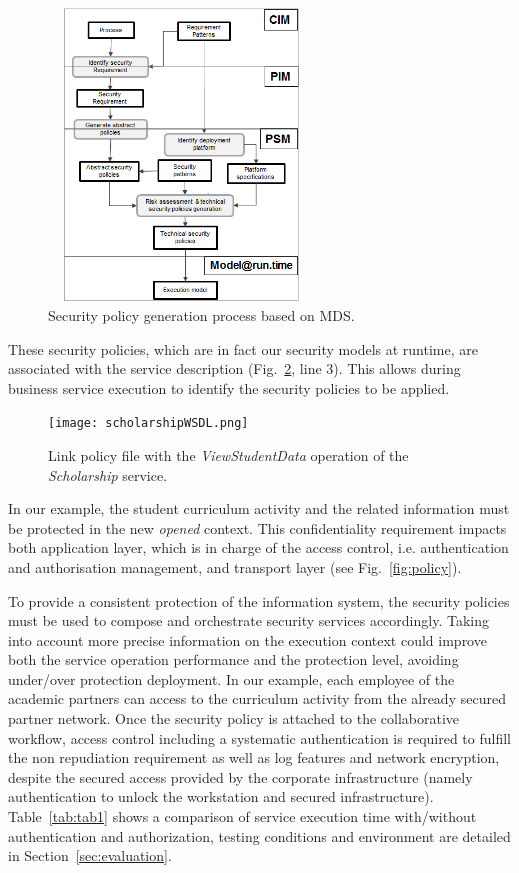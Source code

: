 \documentclass[runningheads,a4paper]{llncs}
\begin{document}
\begin{figure}[ht!] 
\centering
\includegraphics[height=220pt,width=200pt]{mds.png}
\caption{Security policy generation process based on MDS.}
\label{fig:mds}
\end{figure}

These security policies, which are in fact our security models at runtime, are associated with the service description (Fig.~\ref{fig:wsdl}, line 3). This allows during business service execution to identify the security policies to be applied.

\begin{figure}[ht!]  
\centering
\texttt{[image: scholarshipWSDL.png]}
\caption{Link policy file with the \emph{ViewStudentData} operation of the \emph{Scholarship} service.}
\label{fig:wsdl}
\end{figure}

In our example, the student curriculum activity and the related information must be protected in the new \textit{opened} context. This confidentiality requirement impacts both application layer, which is in charge of the access control, i.e. authentication and authorisation management, and transport layer (see Fig.~\ref{fig:policy}). 

To provide a consistent protection of the information system, the security policies must be used to compose and orchestrate security services accordingly. Taking into account more precise information on the execution context could improve both the service operation performance and the protection level, avoiding under/over protection deployment. In our example, each employee of the academic partners can access to the curriculum activity from the already secured partner network. Once the security policy is attached to the collaborative workflow, access control including a systematic authentication is required to fulfill the non repudiation requirement as well as log features and network encryption, despite the secured access provided by the corporate infrastructure (namely authentication to unlock the workstation and secured infrastructure). Table~\ref{tab:tab1} shows a comparison of service execution time with/without authentication and authorization, testing conditions and environment are detailed in Section~\ref{sec:evaluation}.
\end{document}
